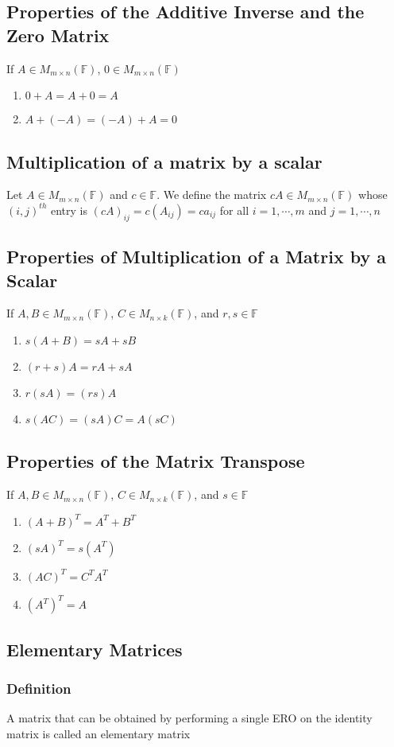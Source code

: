 \documentclass[12pt, letterpaper]{article}
\begin{document}
\subsection*{Properties of the Additive Inverse and the Zero Matrix}
If $A\in M_{m\times n}(\mathbb{F})$, $0\in M_{m\times n}(\mathbb{F})$
\begin{enumerate}
    \item $0+A = A+0 = A$
    \item $A + (-A) = (-A) + A = 0$
\end{enumerate}
\subsection{Multiplication of a matrix by a scalar}
Let $A\in M_{m\times n}(\mathbb{F})$ and $c\in\mathbb{F}$. We define the matrix $cA\in M_{m\times n}(\mathbb{F})$
whose $(i,j)^{th}$ entry is $(cA)_{ij} = c(A_{ij}) = ca_{ij}$ for all $i = 1, \cdots, m$ and $j = 1, \cdots, n$
\subsection*{Properties of Multiplication of a Matrix by a Scalar}
If $A,B\in M_{m\times n}(\mathbb{F})$, $C\in M_{n\times k}(\mathbb{F})$, and $r,s\in\mathbb{F}$
\begin{enumerate}
    \item $s(A+B) = sA + sB$
    \item $(r+s)A = rA + sA$
    \item $r(sA) = (rs)A$
    \item $s(AC) = (sA)C = A(sC)$
\end{enumerate}
\subsection{Properties of the Matrix Transpose}
If $A,B\in M_{m\times n}(\mathbb{F})$, $C\in M_{n\times k}(\mathbb{F})$, and $s\in\mathbb{F}$
\begin{enumerate}
    \item $(A+B)^T = A^T + B^T$
    \item $(sA)^T = s(A^T)$
    \item $(AC)^T = C^TA^T$
    \item $(A^T)^T = A$
\end{enumerate}
\subsection{Elementary Matrices}
\subsubsection{Definition}
A matrix that can be obtained by performing a single ERO on the identity matrix is called an elementary matrix
\end{document}
